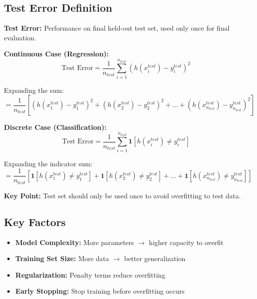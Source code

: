 \documentclass{article}
\begin{document}
\subsection{Test Error Definition}
\textbf{Test Error:} Performance on final held-out test set, used only once for final evaluation.

\textbf{Continuous Case (Regression):}
\[
\text{Test Error} = \frac{1}{n_{test}}\sum_{i=1}^{n_{test}} (h(x_i^{test}) - y_i^{test})^2
\]

Expanding the sum:
\[
= \frac{1}{n_{test}}\left[ (h(x_1^{test}) - y_1^{test})^2 + (h(x_2^{test}) - y_2^{test})^2 + \ldots + (h(x_{n_{test}}^{test}) - y_{n_{test}}^{test})^2 \right]
\]

\textbf{Discrete Case (Classification):}
\[
\text{Test Error} = \frac{1}{n_{test}}\sum_{i=1}^{n_{test}} \mathbf{1}[h(x_i^{test}) \neq y_i^{test}]
\]

Expanding the indicator sum:
\[
= \frac{1}{n_{test}}\left[ \mathbf{1}[h(x_1^{test}) \neq y_1^{test}] + \mathbf{1}[h(x_2^{test}) \neq y_2^{test}] + \ldots + \mathbf{1}[h(x_{n_{test}}^{test}) \neq y_{n_{test}}^{test}] \right]
\]

\textbf{Key Point:} Test set should only be used once to avoid overfitting to test data.

\subsection{Key Factors}
\begin{itemize}
    \item \textbf{Model Complexity:} More parameters $\rightarrow$ higher capacity to overfit
    \item \textbf{Training Set Size:} More data $\rightarrow$ better generalization
    \item \textbf{Regularization:} Penalty terms reduce overfitting
    \item \textbf{Early Stopping:} Stop training before overfitting occurs
\end{itemize}
\end{document}
